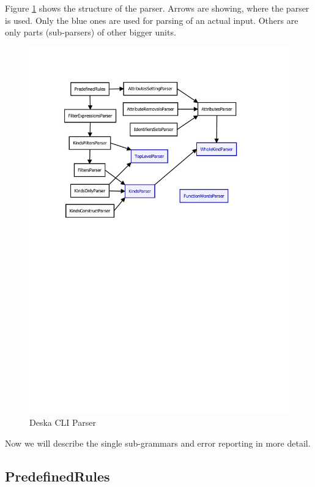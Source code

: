 \documentclass[deska]{subfiles}
\begin{document}
Figure \ref{img:deska-cli-parser} shows the structure of the parser. Arrows are showing, where the parser is used. Only the blue
ones are used for parsing of an actual input. Others are only parts (sub-parsers) of other bigger units.

\begin{figure}[h]
    \centering
    \label{img:deska-cli-parser}
    \includegraphics[trim=28mm 157mm 41mm 28mm, clip=true]{img-deska-cli-parser.pdf}
    \caption{Deska CLI Parser}
\end{figure}

Now we will describe the single sub-grammars and error reporting in more detail.

\subsection{PredefinedRules}
\end{document}
